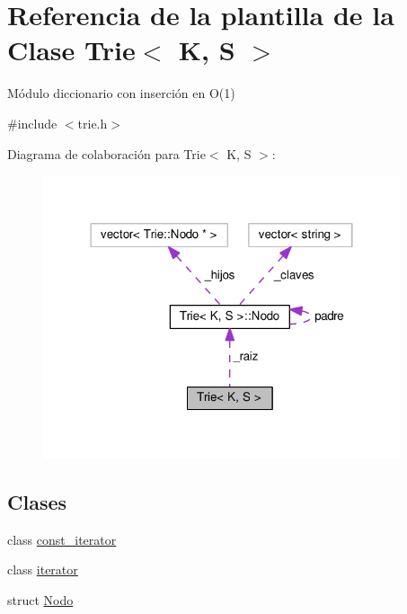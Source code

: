 \hypertarget{classTrie}{\section{Referencia de la plantilla de la Clase Trie$<$ K, S $>$}
\label{classTrie}
}


Módulo diccionario con inserción en O(1)  




{\ttfamily \#include $<$trie.\-h$>$}



Diagrama de colaboración para Trie$<$ K, S $>$\-:
\nopagebreak
\begin{figure}[H]
\begin{center}
\leavevmode
\includegraphics[width=298pt]{classTrie__coll__graph}
\end{center}
\end{figure}
\subsection*{Clases}
\begin{DoxyCompactItemize}
\item 
class \hyperlink{classTrie_1_1const__iterator}{const\-\_\-iterator}
\item 
class \hyperlink{classTrie_1_1iterator}{iterator}
\item 
struct \hyperlink{structTrie_1_1Nodo}{Nodo}
\end{DoxyCompactItemize}

